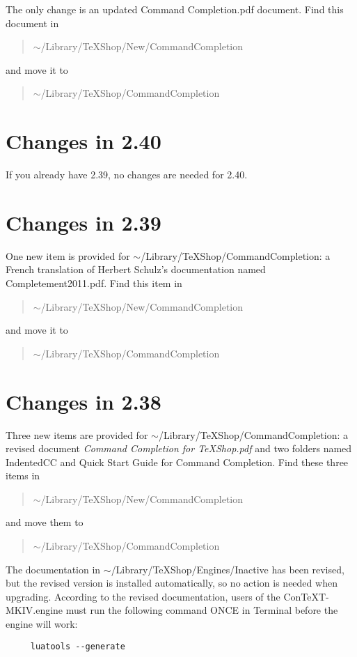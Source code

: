 \documentclass[11pt, oneside]{amsart}
\begin{document}
The only change is an updated Command Completion.pdf document. Find this document in
\begin{quotation}
 $\sim$/Library/TeXShop/New/CommandCompletion
 \end{quotation}  and move it to  \begin{quotation}$\sim$/Library/TeXShop/CommandCompletion\end{quotation}

\section{Changes in 2.40}

If you already have 2.39, no changes are needed for 2.40.

\section{Changes in 2.39}

One new item is provided for 
	$\sim$/Library/TeXShop/CommandCompletion: a French translation of Herbert Schulz's documentation  named
	Completement2011.pdf.
Find this item in
\begin{quotation} 
$\sim$/Library/TeXShop/New/CommandCompletion
\end{quotation}
 and move it to 
 \begin{quotation}
 $\sim$/Library/TeXShop/CommandCompletion
 \end{quotation}


\section{Changes in 2.38}

Three new items are provided for $\sim$/Library/TeXShop/CommandCompletion: a revised document {\em Command Completion for TeXShop.pdf}
and two folders named IndentedCC and Quick Start Guide for Command Completion. Find these three items in
\begin{quotation} 
$\sim$/Library/TeXShop/New/CommandCompletion
\end{quotation}
 and move them to 
 \begin{quotation}
 $\sim$/Library/TeXShop/CommandCompletion
 \end{quotation}

The documentation in $\sim$/Library/TeXShop/Engines/Inactive has been revised, but the revised version is installed automatically, so no action
is needed when upgrading. According to the revised documentation, users of the ConTeXT-MKIV.engine must run the following
command ONCE in Terminal before the engine will work:
\begin{verbatim}
     luatools --generate
\end{verbatim}
\end{document}
